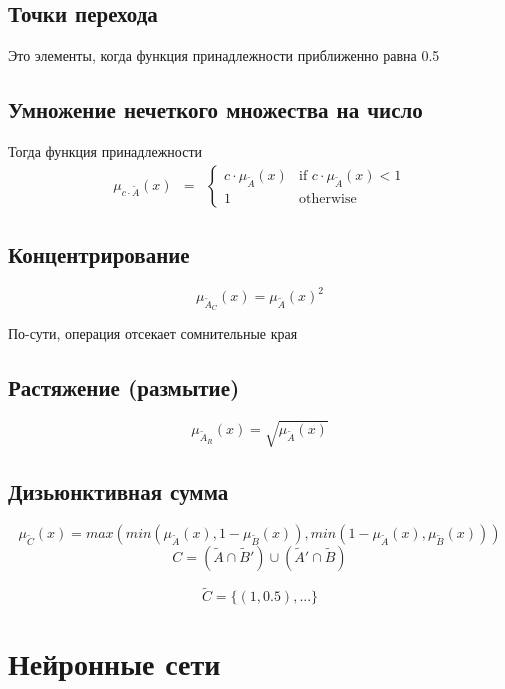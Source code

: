 		\subsection{Точки перехода}
			Это элементы, когда функция принадлежности приближенно равна 0.5
		
		\subsection{Умножение нечеткого множества на число}
			Тогда функция принадлежности 
			\begin{equation}
				\begin{matrix}
					\mu_{c \cdot \tilde A}(x) & =
					& \left\{
					\begin{matrix}
						c \cdot \mu_{\tilde A}(x) & \mbox{if } c \cdot \mu_{\tilde A}(x) < 1\\
						1 & \mbox{otherwise }
					\end{matrix} \right.
				\end{matrix}
			\end{equation}
				
		\subsection{Концентрирование} 
			\[\mu_{\tilde A_C}(x) = \mu_{\tilde A}(x)^2\]
			
			По-сути, операция отсекает сомнительные края
			
		\subsection{Растяжение (размытие)}
			\[\mu_{\tilde A_R}(x) = \sqrt{\mu_{\tilde A}(x)}\]
			
		\subsection{Дизьюнктивная сумма}
			\[\mu_{\tilde C}(x) = max(min(\mu_{\tilde A}(x), 1 - \mu_{\tilde B}(x)), min(1 - \mu_{\tilde A}(x), \mu_{\tilde B}(x)))\]
			\[C = (\tilde A \cap \tilde B') \cup (\tilde A' \cap \tilde B)\]
			
			\[\tilde C = \{(1, 0.5), ...\}\]
	\section{Нейронные сети}
